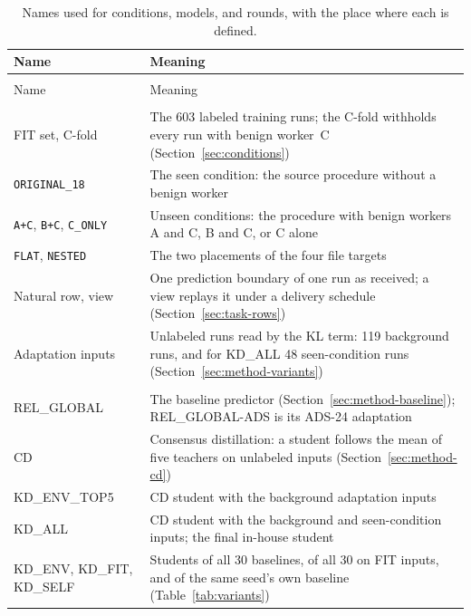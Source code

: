 {\small{}%
\begin{xltabular}{\textwidth}{@{}>{\raggedright\arraybackslash}p{0.27\textwidth}>{\raggedright\arraybackslash}X@{}}
\caption[Names used for conditions, models, and rounds]{Names used for conditions, models, and rounds, with the place
where each is defined.}
\label{tab:names}\\
\toprule
Name & Meaning \\
\midrule
\endfirsthead
{}\\
\toprule
Name & Meaning \\
\midrule
\endhead
\bottomrule
\endlastfoot
{} \\
FIT set, C-fold & The 603 labeled training runs; the C-fold withholds every run with benign worker~C (Section~\ref{sec:conditions}) \\
\texttt{ORIGINAL\_18} & The seen condition: the source procedure without a benign worker \\
\texttt{A+C}, \texttt{B+C}, \texttt{C\_ONLY} & Unseen conditions: the procedure with benign workers A and C, B and C, or C alone \\
\texttt{FLAT}, \texttt{NESTED} & The two placements of the four file targets \\
Natural row, view & One prediction boundary of one run as received; a view replays it under a delivery schedule (Section~\ref{sec:task-rows}) \\
Adaptation inputs & Unlabeled runs read by the KL term: 119 background runs, and for KD\_ALL 48 seen-condition runs (Section~\ref{sec:method-variants}) \\
\midrule
{} \\
REL\_GLOBAL & The baseline predictor (Section~\ref{sec:method-baseline}); REL\_GLOBAL-ADS is its ADS-24 adaptation \\
CD & Consensus distillation: a student follows the mean of five teachers on unlabeled inputs (Section~\ref{sec:method-cd}) \\
KD\_ENV\_TOP5 & CD student with the background adaptation inputs \\
KD\_ALL & CD student with the background and seen-condition inputs; the final in-house student \\
KD\_ENV, KD\_FIT, KD\_SELF & Students of all 30 baselines, of all 30 on FIT inputs, and of the same seed's own baseline (Table~\ref{tab:variants}) \\

\end{xltabular}}
